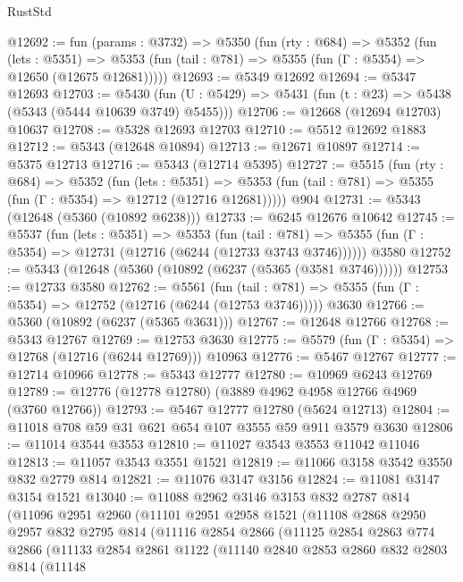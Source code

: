 \begin{lexlean}{RustStd}
\begin{coremodule}
@12692 := fun (params : @3732) =>
  @5350
    (fun (rty : @684) =>
    @5352
      (fun (lets : @5351) =>
      @5353 (fun (tail : @781) => @5355 (fun (Γ : @5354) => @12650 (@12675 @12681)))))
@12693 := @5349 @12692
@12694 := @5347 @12693
@12703 := @5430
    (fun (U : @5429) => @5431 (fun (t : @23) => @5438 (@5343 (@5444 @10639 @3749) @5455)))
@12706 := @12668 (@12694 @12703) @10637
@12708 := @5328 @12693 @12703
@12710 := @5512 @12692 @1883
@12712 := @5343 (@12648 @10894)
@12713 := @12671 @10897
@12714 := @5375 @12713
@12716 := @5343 (@12714 @5395)
@12727 := @5515
    (fun (rty : @684) =>
    @5352
      (fun (lets : @5351) =>
      @5353 (fun (tail : @781) => @5355 (fun (Γ : @5354) => @12712 (@12716 @12681)))))
    @904
@12731 := @5343 (@12648 (@5360 (@10892 @6238)))
@12733 := @6245 @12676 @10642
@12745 := @5537
    (fun (lets : @5351) =>
    @5353
      (fun (tail : @781) =>
      @5355 (fun (Γ : @5354) => @12731 (@12716 (@6244 (@12733 @3743 @3746))))))
    @3580
@12752 := @5343 (@12648 (@5360 (@10892 (@6237 (@5365 (@3581 @3746))))))
@12753 := @12733 @3580
@12762 := @5561
    (fun (tail : @781) => @5355 (fun (Γ : @5354) => @12752 (@12716 (@6244 (@12753 @3746)))))
    @3630
@12766 := @5360 (@10892 (@6237 (@5365 @3631)))
@12767 := @12648 @12766
@12768 := @5343 @12767
@12769 := @12753 @3630
@12775 := @5579 (fun (Γ : @5354) => @12768 (@12716 (@6244 @12769))) @10963
@12776 := @5467 @12767
@12777 := @12714 @10966
@12778 := @5343 @12777
@12780 := @10969 @6243 @12769
@12789 := @12776 (@12778 @12780) (@3889 @4962 @4958 @12766 @4969 (@3760 @12766))
@12793 := @5467 @12777 @12780 (@5624 @12713)
@12804 := @11018 @708 @59 @31 @621 @654 @107 @3555 @59 @911 @3579 @3630
@12806 := @11014 @3544 @3553
@12810 := @11027 @3543 @3553 @11042 @11046
@12813 := @11057 @3543 @3551 @1521
@12819 := @11066 @3158 @3542 @3550 @832 @2779 @814
@12821 := @11076 @3147 @3156
@12824 := @11081 @3147 @3154 @1521
@13040 := @11088
    @2962
    @3146
    @3153
    @832
    @2787
    @814
    (@11096
      @2951
      @2960
      (@11101
        @2951
        @2958
        @1521
        (@11108
          @2868
          @2950
          @2957
          @832
          @2795
          @814
          (@11116
            @2854
            @2866
            (@11125
              @2854
              @2863
              @774
              @2866
              (@11133
                @2854
                @2861
                @1122
                (@11140
                  @2840
                  @2853
                  @2860
                  @832
                  @2803
                  @814
                  (@11148

\end{coremodule}
\end{lexlean}
